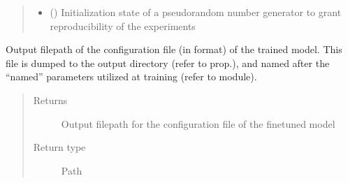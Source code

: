\documentclass[letterpaper,10pt,english]{sphinxmanual}
\begin{document}
\begin{fulllineitems}
\begin{fulllineitems}
\begin{quote}
\begin{description}
\begin{itemize}
\item {} 
\sphinxAtStartPar
{} () \textendash{} Initialization state of a pseudo\sphinxhyphen{}random number generator to grant reproducibility of
the experiments

\end{itemize}

\end{description}\end{quote}

\end{fulllineitems}


\begin{fulllineitems}
\label{\detokenize{code:gpt2_summarizer_train.TrainGPT2Summarizer._config_file}}
\sphinxAtStartPar
Output filepath of the configuration file (in  format) of the trained model. This file
is dumped to the output directory (refer to  prop.), and named after the “named”
parameters utilized at training (refer to  module).
\begin{quote}\begin{description}
\item[{Returns}] \leavevmode
\sphinxAtStartPar
Output filepath for the configuration file of the fine\sphinxhyphen{}tuned model

\item[{Return type}] \leavevmode
\sphinxAtStartPar
Path

\end{description}\end{quote}

\end{fulllineitems}



\end{fulllineitems}
\end{document}
